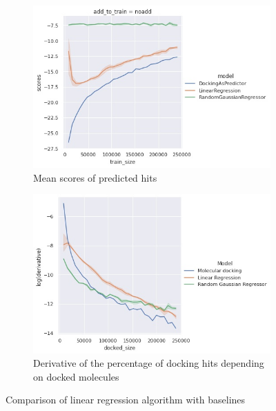 \begin{figure}
\centering
\begin{subfigure}{\textwidth}
\includegraphics[width = 0.95\linewidth]{Images/4eiyScoresBest.jpg}
\caption{Mean scores of predicted hits}
\end{subfigure}
\begin{subfigure}{\textwidth}
\includegraphics[width=0.95\linewidth]{Images/4eiyDerivative.jpg}
\caption{Derivative of the percentage of docking hits depending on docked molecules}
\end{subfigure}
\caption{Comparison of linear regression algorithm with baselines}
\label{tsne}
\end{figure}

